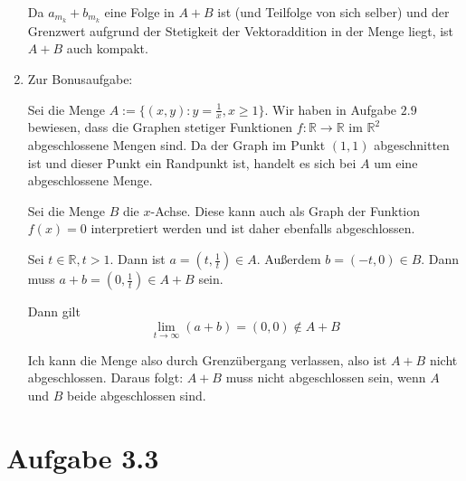 \documentclass[a4paper,german,12pt,smallheadings]{scrartcl}
\begin{document}
\begin{enumerate}[(1)]
    Da $a_{m_k} + b_{m_k}$ eine Folge in $A+B$ ist (und Teilfolge von sich
    selber) und der Grenzwert aufgrund der Stetigkeit der Vektoraddition in der
    Menge liegt, ist $A+B$ auch kompakt.

  \item
    Zur Bonusaufgabe:

    Sei die Menge $A := \{(x,y): y = \frac{1}{x}, x \ge 1\}$. Wir
    haben in Aufgabe $2.9$ bewiesen, dass die Graphen stetiger Funktionen $f:
    \mathbb{R} \to \mathbb{R}$ im $\mathbb{R}^2$ abgeschlossene Mengen sind. Da der
    Graph im Punkt $(1,1)$ abgeschnitten ist und dieser Punkt ein Randpunkt ist,
    handelt es sich bei $A$ um eine abgeschlossene Menge.

    Sei die Menge $B$ die $x$-Achse. Diese kann auch als Graph der Funktion $f(x) =
    0$ interpretiert werden und ist daher ebenfalls abgeschlossen.

    Sei $t \in \mathbb{R}, t > 1$. Dann ist $a = (t, \frac{1}{t}) \in A$. Außerdem
    $b = (-t, 0) \in B$. Dann muss $a+b = (0, \frac{1}{t}) \in A+B$ sein.

    Dann gilt
    \begin{equation*}
      \lim_{t \to \infty} (a+b) = (0,0) \notin A+B
    \end{equation*}

    Ich kann die Menge also durch Grenzübergang verlassen, also ist $A+B$ nicht
    abgeschlossen. Daraus folgt: $A + B$ muss nicht abgeschlossen sein, wenn $A$
    und $B$ beide abgeschlossen sind.
\end{enumerate}

\section*{Aufgabe 3.3}
\end{document}
